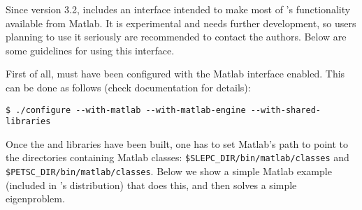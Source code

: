 Since version 3.2, \slepc includes an interface intended to make most of \slepc's functionality available from Matlab. It is experimental and needs further development, so users planning to use it seriously are recommended to contact the authors. Below are some guidelines for using this interface.

First of all, \petsc must have been configured with the Matlab interface enabled. This can be done as follows (check \petsc documentation for details):
	\begin{Verbatim}[fontsize=\small]
	$ ./configure --with-matlab --with-matlab-engine --with-shared-libraries
	\end{Verbatim}

Once the \petsc and \slepc libraries have been built, one has to set Matlab's path to point to the directories containing Matlab classes: \Verb!$SLEPC_DIR/bin/matlab/classes! and \Verb!$PETSC_DIR/bin/matlab/classes!. Below we show a simple Matlab example (included in \slepc's distribution) that does this, and then solves a simple eigenproblem.


